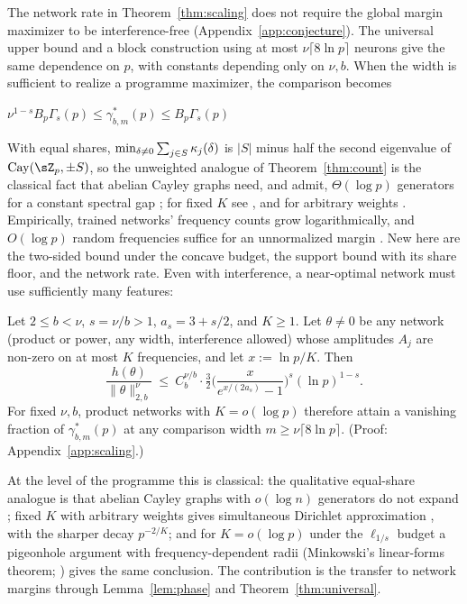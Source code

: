 The network rate in Theorem~\ref{thm:scaling} does not require the global margin maximizer to be interference-free (Appendix~\ref{app:conjecture}). The universal upper bound and a block construction using at most $\nu\lceil8\ln p\rceil$ neurons give the same dependence on $p$, with constants depending only on $\nu,b$. When the width is sufficient to realize a programme maximizer, the comparison becomes 

$\nu^{1-s}B_p\Gamma_s(p)\le\gamma^*_{b,m}(p)\le B_p\Gamma_s(p)$ 

With equal shares, $\min_{\delta\ne0}\sum_{j\in S}\kappa_{j}(\delta)$ is $|S|$ minus half the second eigenvalue of $\mathrm{Cay}(\sZ_p,\pm S)$, so the unweighted analogue of Theorem~\ref{thm:count} is the classical fact that abelian Cayley graphs need, and admit, $\Theta(\log p)$ generators for a constant spectral gap \citep[Sec.~3]{alon1994random}; for fixed $K$ see \citet{friedman2006spectral}, and for arbitrary weights \citet{wang2025positive}. Empirically, trained networks' frequency counts grow logarithmically, and $O(\log p)$ random frequencies suffice for an unnormalized margin \citep{mccracken2025}. New here are the two-sided bound under the concave budget, the support bound with its share floor, and the network rate. Even with interference, a near-optimal network must use sufficiently many features:

\begin{corollary}[]\label{cor:few}
Let $2\le b<\nu$, $s=\nu/b>1$, $a_s=3+s/2$, and $K\ge1$. Let $\theta\neq0$ be any network (product or power, any width, interference allowed) whose amplitudes $A_j$ are non-zero on at most $K$ frequencies, and let $x:=\ln p/K$. Then
\[
\frac{h(\theta)}{\|\theta\|_{2,b}^\nu}\ \le\ C_b^{\nu/b}\cdot\tfrac32\Big(\frac{x}{e^{x/(2a_s)}-1}\Big)^{s}(\ln p)^{1-s}.
\]
For fixed $\nu,b$, product networks with $K=o(\log p)$ therefore attain a vanishing fraction of $\gamma^*_{b,m}(p)$ at any comparison width $m\ge\nu\lceil8\ln p\rceil$. (Proof: Appendix~\ref{app:scaling}.)
\end{corollary}

At the level of the programme this is classical: the qualitative equal-share analogue is that abelian Cayley graphs with $o(\log n)$ generators do not expand \citep[Prop.~3]{alon1994random}; fixed $K$ with arbitrary weights gives simultaneous Dirichlet approximation \citep{schmidt1980diophantine}, with the sharper decay $p^{-2/K}$; and for $K=o(\log p)$ under the $\ell_{1/s}$ budget a pigeonhole argument with frequency-dependent radii (Minkowski's linear-forms theorem; \citealp{cassels1959introduction}) gives the same conclusion. The contribution is the transfer to network margins through Lemma~\ref{lem:phase} and Theorem~\ref{thm:universal}.

